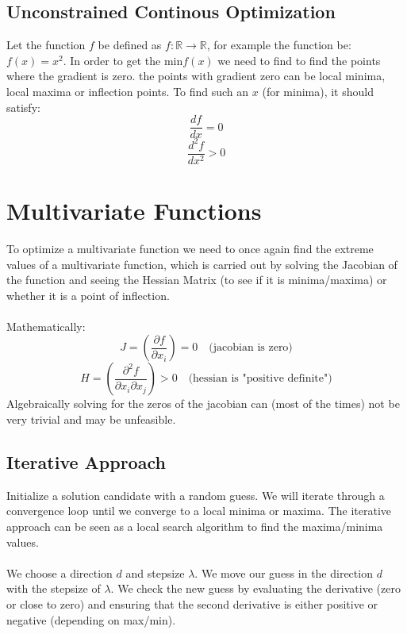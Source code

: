 \documentclass[12pt, a4paper]{book}
\begin{document}
\subsection{Unconstrained Continous Optimization}
Let the function $f$ be defined as $f: \mathbb{R} \to \mathbb{R}$, for example the function be: $f(x) = x^2$. In order to get the min$f(x)$ we need to find to find the points where the gradient is zero. the points with gradient zero can be local minima, local maxima or inflection points. To find such an $x$ (for minima), it should satisfy:
$$\frac{df}{dx} = 0$$
$$\frac{d^2f}{dx^2} > 0$$

\section{Multivariate Functions}
To optimize a multivariate function we need to once again find the extreme values of a multivariate function, which is carried out by solving the Jacobian of the function and seeing the Hessian Matrix (to see if it is minima/maxima) or whether it is a point of inflection.\\\\
Mathematically:
$$J = \left(\frac{\partial f}{\partial x_i} \right) = 0 \quad  \text{(jacobian is zero)}$$
$$H = \left(\frac{\partial^2f}{\partial x_i \partial x_j} \right) > 0 \quad \text{(hessian is "positive definite")}$$
$$$$
Algebraically solving for the zeros of the jacobian can (most of the times) not be very trivial and may be unfeasible.

\subsection{Iterative Approach}
Initialize a solution candidate with a random guess. We will iterate through a convergence loop until we converge to a local minima  or maxima. The iterative approach can be seen as a local search algorithm to find the maxima/minima values.\\\\
We choose a direction $d$ and stepsize $\lambda$. We move our guess in the direction $d$ with the stepsize of $\lambda$. We check the new guess by evaluating the derivative (zero or close to zero) and ensuring that the second derivative is either positive or negative (depending on max/min).
\end{document}

